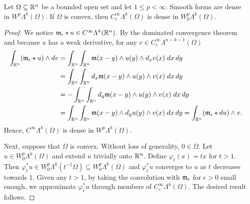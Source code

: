 \documentclass[10pt,a4paper]{article}
\newcommand{\mwl}[1]{{\color{red}#1}}
\begin{document}
\begin{lemma}
    Let $\Omega \subseteq {\mathbb R}^{n}$ be a bounded open set and let $1 \leq p < \infty$. 
    Smooth forms are dense in $W^{p}\Lambda^{k}(\Omega)$.
    If $\Omega$ is convex, then $C^{\infty}_{c}\Lambda^{k}(\Omega)$ is dense in $W^{p}_{0}\Lambda^{k}(\Omega)$. 
\end{lemma}
\begin{proof}
    We notice ${\mathfrak m}_{\epsilon} \star u \in C^{\infty}\Lambda^{k}({\mathbb R}^{n})$. 
    By the dominated convergence theorem and because $u$ has a weak derivative,
    for any $v \in C^{\infty}_{c}\Lambda^{n-k-1}(\Omega)$
    \begin{align*}
        \int_{{\mathbb R}^{n}} ( {\mathfrak m}_{\epsilon} \star u ) \wedge d v 
        &= 
        \int_{{\mathbb R}^{n}} \int_{{\mathbb R}^{n}} {\mathfrak m}(x-y) \wedge u(y) \wedge d_{x} v(x) \;dx\,dy
        \\&= 
        \int_{{\mathbb R}^{n}} \int_{{\mathbb R}^{n}} d_x{\mathfrak m}(x-y) \wedge u(y) \wedge v(x) \;dx\,dy
        \\&= 
        - \int_{{\mathbb R}^{n}} \int_{{\mathbb R}^{n}} d_y{\mathfrak m}(x-y) \wedge u(y) \wedge v(x) \;dx\,dy
        \\&= 
        \int_{{\mathbb R}^{n}} \int_{{\mathbb R}^{n}} {\mathfrak m}(x-y) \wedge d_y u(y) \wedge v(x) \;dx\,dy
        = 
        \int_{{\mathbb R}^{n}} ( {\mathfrak m}_{\epsilon} \star d u ) \wedge v 
        .
    \end{align*}
    Hence, $C^{\infty}\Lambda^{k}(\Omega)$ is dense in $W^{p}\Lambda^{k}(\Omega)$.
    
    Next, suppose that $\Omega$ is convex. Without loss of generality, $0 \in \Omega$. 
    Let $u \in W^{p}_{0}\Lambda^{k}(\Omega)$ and extend $u$ trivially onto ${\mathbb R}^{n}$. 
    Define $\varphi_t(x) = tx$ for $t > 1$. 
    Then $\varphi_{t}^{\ast} u \in W^{p}_{0}\Lambda^{k}(t^{-1}\Omega) \subseteq W^{p}_{0}\Lambda^{k}(\Omega)$ 
    and $\varphi_{t}^{\ast} u$ converges to $u$ as $t$ decreases towards $1$. 
    Given any $t > 1$, by taking the convolution with ${\mathfrak m}_{\epsilon}$ for $\epsilon > 0$ small enough,
    we approximate $\varphi_{t}^{\ast} u$ through members of $C^{\infty}_{c}\Lambda^{k}(\Omega)$.
    The desired result follows. 
\end{proof}
\end{document}
